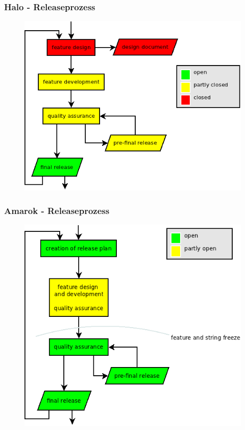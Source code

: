 \documentclass{beamer}
\begin{document}
\begin{frame}
\frametitle{Halo - Releaseprozess}
\begin{figure}[h!]
 \centering
 \includegraphics[scale=0.5,keepaspectratio=true]{./ReleaseProcessHalo.png}
\end{figure}
\end{frame}

\begin{frame}
\frametitle{Amarok - Releaseprozess}
\begin{figure}[h!]
 \centering
 \includegraphics[scale=0.43,keepaspectratio=true]{./ReleaseProcessAmarok.png}
\end{figure}
\end{frame}
\end{document}
